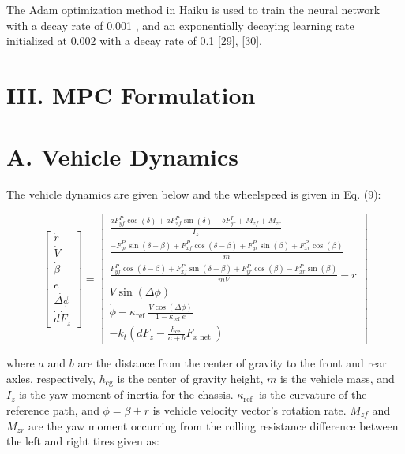 \documentclass[10pt]{article}
\begin{document}
The Adam optimization method in Haiku is used to train the neural network with a decay rate of 0.001 , and an exponentially decaying learning rate initialized at 0.002 with a decay rate of 0.1 [29], [30].

\section*{III. MPC Formulation}
\section*{A. Vehicle Dynamics}
The vehicle dynamics are given below and the wheelspeed is given in Eq. (9):

\[
\left[\begin{array}{c}
\dot{r}  \tag{11}\\
\dot{V} \\
\dot{\beta} \\
\dot{e} \\
\dot{\Delta \phi} \\
\dot{d} \dot{F}_{z}
\end{array}\right]=\left[\begin{array}{c}
\frac{a F_{y f}^{P} \cos (\delta)+a F_{x f}^{P} \sin (\delta)-b F_{y r}^{P}+M_{z f}+M_{z r}}{I_{z}} \\
\frac{-F_{y r}^{P} \sin (\delta-\beta)+F_{x f}^{P} \cos (\delta-\beta)+F_{y r}^{P} \sin (\beta)+F_{x r}^{P} \cos (\beta)}{m} \\
\frac{F_{y f}^{P} \cos (\delta-\beta)+F_{x f}^{P} \sin (\delta-\beta)+F_{y r}^{P} \cos (\beta)-F_{x r}^{P} \sin (\beta)}{m V}-r \\
V \sin (\Delta \phi) \\
\dot{\phi}-\kappa_{\text {ref }} \frac{V \cos (\Delta \phi)}{1-\kappa_{\text {ref }} e} \\
-k_{t}\left(d F_{z}-\frac{h_{\text {ce }}}{a+b} F_{x \text { net }}\right)
\end{array}\right]
\]

where $a$ and $b$ are the distance from the center of gravity to the front and rear axles, respectively, $h_{\mathrm{cg}}$ is the center of gravity height, $m$ is the vehicle mass, and $I_{z}$ is the yaw moment of inertia for the chassis. $\kappa_{\text {ref }}$ is the curvature of the reference path, and $\dot{\phi}=\dot{\beta}+r$ is vehicle velocity vector's rotation rate. $M_{z f}$ and $M_{z r}$ are the yaw moment occurring from the rolling resistance difference between the left and right tires given as:
\end{document}
